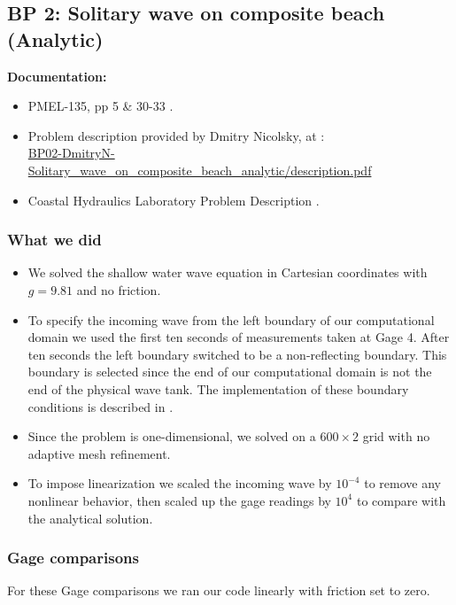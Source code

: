 \newsection

\subsection{BP 2:
 Solitary wave on composite beach (Analytic)}

{\bf Documentation:}

\begin{itemize}
\item PMEL-135, pp 5 \& 30-33 \cite{SynolakisBernard:pmel135}.
\item Problem description provided by Dmitry Nicolsky, 
at \cite{bp-description}: \\
\href{https://github.com/rjleveque/nthmp-benchmark-problems/blob/master/BP02-DmitryN-Solitary_wave_on_composite_beach_analytic/description.pdf}
{BP02-DmitryN-Solitary\_wave\_on\_composite\_beach\_analytic/description.pdf} 
\item Coastal Hydraulics Laboratory Problem Description \cite{CHLBP2}.
\end{itemize}

\subsubsection{What we did}
\begin{itemize}

\item We solved the shallow water wave equation in Cartesian coordinates with $g = 9.81$ and no friction.
\item To specify the incoming wave from the left boundary of our computational domain we used the first ten seconds of  measurements taken at Gage 4.  After ten seconds the left boundary switched to be a non-reflecting boundary.  This boundary is selected since the end of our computational domain is not the end of the physical wave tank.  
The implementation of these boundary conditions is described in .
\item Since the problem is one-dimensional, we solved on a $600 \times 2$ grid with no adaptive mesh refinement.
\item To impose linearization we scaled the incoming wave by $10^{-4}$ to
remove  any nonlinear behavior, then scaled up the gage readings by $10^4$
to compare with the analytical solution.
\end{itemize}

\subsubsection{Gage comparisons}
For these Gage comparisons we ran our code linearly with friction set to zero. 

